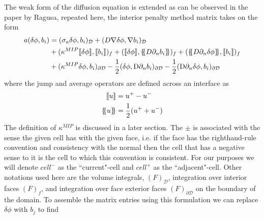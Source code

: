 \documentclass[11pt,letterpaper,titlepage]{article}
\newcommand*{\ldblbrace}{\{\mskip-5mu\{}
\newcommand*{\rdblbrace}{\}\mskip-5mu\}}
\numberwithin{equation}{section}
\begin{document}
The weak form of the diffusion equation is extended as can be observed 
in the paper by Ragusa, repeated here, the interior penalty method matrix takes on the form
\begin{equation*}
\begin{aligned}
a(\delta \phi,b_i) &= 
(\sigma_a \delta \phi, b_i)_{\mathcal{D}} + 
(D\nabla \delta \phi,\nabla b_i)_{\mathcal{D}} \\
&+ 
(\kappa^{MIP} \llbracket \delta \phi \rrbracket,\llbracket b_i \rrbracket)_f +
(\llbracket \delta \phi \rrbracket,\ldblbrace D \partial_n b_i \rdblbrace)_f +
(\ldblbrace D \partial_n \delta \phi \rdblbrace,\llbracket b_i \rrbracket)_f \\
&+
(\kappa^{M I P} \delta \phi, b_{i})_{\partial \mathcal{D}} -
\frac{1}{2}(\delta \phi, \mathrm{D} \partial_{n} b_{i})_{\partial \mathcal{D}}-
\frac{1}{2}(\mathrm{D} \partial_{n} \delta \phi, b_{i})_{\partial \mathcal{D}}
\end{aligned}
\end{equation*}
\newline
where the jump and average operators are defined across an interface as
\begin{equation*}
\begin{aligned}
\llbracket u \rrbracket &= u^+ - u^- \\
\ldblbrace u \rdblbrace &= \frac{1}{2}(u^+ + u^-)
\end{aligned}
\end{equation*}
\newline 
The definition of $\kappa^{MIP}$ is discussed in a later section.
The $\pm$ is associated with the sense the given cell has with the given 
face, i.e. if the face has the righthand-rule convention and consistency 
with the normal then the cell that has a negative sense to it is the 
cell to which this convention is consistent. For our purposes we will 
denote $cell^-$ as the ``current"-cell and $cell^+$ as the ``adjacent"-cell.
\newline 
\newline
Other notations used here are the volume integrals, $(F)_{\mathcal{D}}$, 
integration over interior faces $(F)_f$, and integration over face 
exterior faces $(F)_{\partial \mathcal{D}}$ on the boundary of the domain.
\newline 
\newline
To assemble the matrix entries using this formulation we can replace $\delta \phi$ with $b_j$ to find
\end{document}
